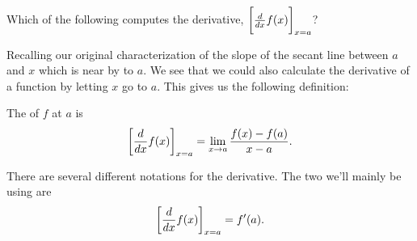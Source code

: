 \documentclass{ximera}
\begin{document}
\begin{question} 
    Which of the following computes the derivative, $\bigg[ \frac{d}{\mathop{}\!d x} f(x) \bigg]_{x=a}$?
    \begin{selectAll}
    \end{selectAll}
\end{question}

Recalling our original characterization of the slope of the secant line
between $a$ and $x$ which is near by to $a$.  We see that we could also
calculate the derivative of a function by letting $x$ go to $a$.  This 
gives us the following definition:

\begin{definition}
	The  of $f$ at $a$ is
	\[
	\bigg[ \frac{d}{\mathop{}\!d x} f(x) \bigg]_{x=a} = \lim_{x\to a} \frac{f(x) - f(a)}{x-a}.
	\]
\end{definition}

\begin{definition}
  There are several different notations for the derivative.  The two we'll mainly be using are
  \[
  \bigg[ \frac{d}{\mathop{}\!d x} f(x) \bigg]_{x=a} = f'(a).
  \]
\end{definition}
\end{document}
